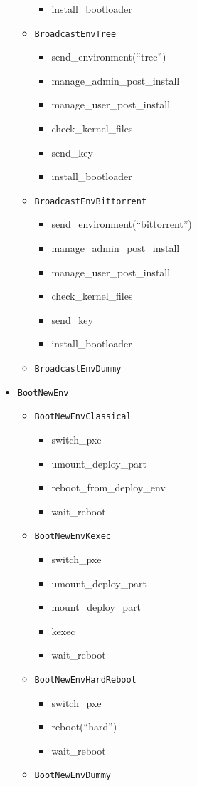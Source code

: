 \documentclass[a4wide,10pt,oneside]{book}
\begin{document}
\begin{itemize}
\begin{itemize}
\begin{itemize}
      \item install\_bootloader
      \end{itemize}
    \item \texttt{BroadcastEnvTree}
      \begin{itemize}
      \item send\_environment(``tree'')
      \item manage\_admin\_post\_install
      \item manage\_user\_post\_install
      \item check\_kernel\_files
      \item send\_key
      \item install\_bootloader
      \end{itemize}
    \item \texttt{BroadcastEnvBittorrent}
      \begin{itemize}
      \item send\_environment(``bittorrent'')
      \item manage\_admin\_post\_install
      \item manage\_user\_post\_install
      \item check\_kernel\_files
      \item send\_key
      \item install\_bootloader
      \end{itemize}
    \item \texttt{BroadcastEnvDummy}
  \end{itemize}
\item \texttt{BootNewEnv}
  \begin{itemize}
    \item \texttt{BootNewEnvClassical}
      \begin{itemize}
      \item switch\_pxe
      \item umount\_deploy\_part
      \item reboot\_from\_deploy\_env
      \item wait\_reboot
      \end{itemize}
    \item \texttt{BootNewEnvKexec}
      \begin{itemize}
      \item switch\_pxe
      \item umount\_deploy\_part
      \item mount\_deploy\_part
      \item kexec
      \item wait\_reboot
      \end{itemize}
    \item \texttt{BootNewEnvHardReboot}
      \begin{itemize}
      \item switch\_pxe
      \item reboot(``hard'')
      \item wait\_reboot
      \end{itemize}
    \item \texttt{BootNewEnvDummy}
  \end{itemize}
\end{itemize}
\end{document}
